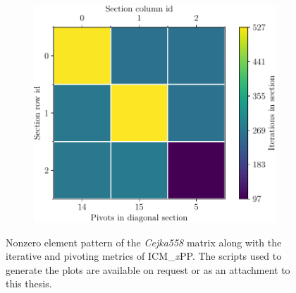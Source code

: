 \begin{figure}[ht!]
\begin{subfigure}[t]{0.51\textwidth}
		\includegraphics[width=\textwidth, keepaspectratio, clip]{images/ch03/input-matrices/decomposition-benchmarks/Cejka558_icmxpp_metrics.pdf}
		\label{Figure:comparing-decomposers-and-solvers->decomposition-project-benchmarks->decomposers-benchmark->comparison-of-execution-times-on-subset-of-matrices->ICMxPP-metrics->Cejka558}
	\end{subfigure}
	\caption{Nonzero element pattern of the \textit{Cejka558} matrix along with the iterative and pivoting metrics of ICM\_\textit{x}PP. The scripts used to generate the plots are available on request or as an attachment to this thesis.}
	\label{Figure:comparing-decomposers-and-solvers->decomposition-project-benchmarks->decomposers-benchmark->comparison-of-execution-times-on-subset-of-matrices->matrix-with-metrics->Cejka558}
\end{figure}


